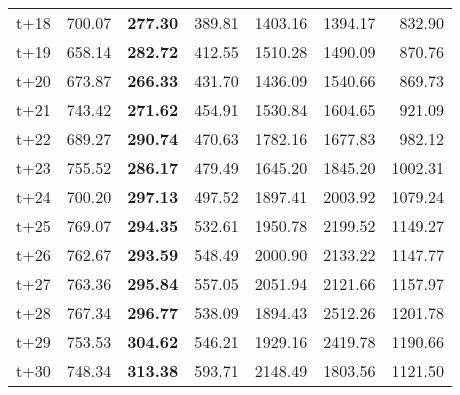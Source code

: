 \begin{table}[H]
\begin{tabular}{lrrrrrr}
t+18  & 700.07  & \textbf{277.30}  & 389.81  & 1403.16  & 1394.17  & 832.90  \\
t+19  & 658.14  & \textbf{282.72}  & 412.55  & 1510.28  & 1490.09  & 870.76  \\
t+20  & 673.87  & \textbf{266.33}  & 431.70  & 1436.09  & 1540.66  & 869.73  \\
t+21  & 743.42  & \textbf{271.62}  & 454.91  & 1530.84  & 1604.65  & 921.09  \\
t+22  & 689.27  & \textbf{290.74}  & 470.63  & 1782.16  & 1677.83  & 982.12  \\
t+23  & 755.52  & \textbf{286.17}  & 479.49  & 1645.20  & 1845.20  & 1002.31  \\
t+24  & 700.20  & \textbf{297.13}  & 497.52  & 1897.41  & 2003.92  & 1079.24  \\
t+25  & 769.07  & \textbf{294.35}  & 532.61  & 1950.78  & 2199.52  & 1149.27  \\
t+26  & 762.67  & \textbf{293.59}  & 548.49  & 2000.90  & 2133.22  & 1147.77  \\
t+27  & 763.36  & \textbf{295.84}  & 557.05  & 2051.94  & 2121.66  & 1157.97  \\
t+28  & 767.34  & \textbf{296.77}  & 538.09  & 1894.43  & 2512.26  & 1201.78  \\
t+29  & 753.53  & \textbf{304.62}  & 546.21  & 1929.16  & 2419.78  & 1190.66  \\
t+30  & 748.34  & \textbf{313.38}  & 593.71  & 2148.49  & 1803.56  & 1121.50  \\

\bottomrule
\end{tabular}
\end{table}
